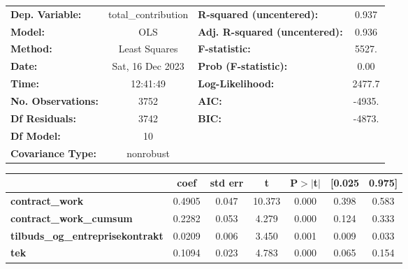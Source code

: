 \begin{center}
\begin{tabular}{lclc}
\toprule
\textbf{Dep. Variable:}                  & total\_contribution & \textbf{  R-squared (uncentered):}      &     0.937   \\
\textbf{Model:}                          &         OLS         & \textbf{  Adj. R-squared (uncentered):} &     0.936   \\
\textbf{Method:}                         &    Least Squares    & \textbf{  F-statistic:       }          &     5527.   \\
\textbf{Date:}                           &   Sat, 16 Dec 2023  & \textbf{  Prob (F-statistic):}          &     0.00    \\
\textbf{Time:}                           &       12:41:49      & \textbf{  Log-Likelihood:    }          &    2477.7   \\
\textbf{No. Observations:}               &          3752       & \textbf{  AIC:               }          &    -4935.   \\
\textbf{Df Residuals:}                   &          3742       & \textbf{  BIC:               }          &    -4873.   \\
\textbf{Df Model:}                       &            10       & \textbf{                     }          &             \\
\textbf{Covariance Type:}                &      nonrobust      & \textbf{                     }          &             \\
\bottomrule
\end{tabular}
\begin{tabular}{lcccccc}
                                         & \textbf{coef} & \textbf{std err} & \textbf{t} & \textbf{P$> |$t$|$} & \textbf{[0.025} & \textbf{0.975]}  \\
\midrule
\textbf{contract\_work}                  &       0.4905  &        0.047     &    10.373  &         0.000        &        0.398    &        0.583     \\
\textbf{contract\_work\_cumsum}          &       0.2282  &        0.053     &     4.279  &         0.000        &        0.124    &        0.333     \\
\textbf{tilbuds\_og\_entreprisekontrakt} &       0.0209  &        0.006     &     3.450  &         0.001        &        0.009    &        0.033     \\
\textbf{tek}                             &       0.1094  &        0.023     &     4.783  &         0.000        &        0.065    &        0.154     \\

\end{tabular}
\end{center}
